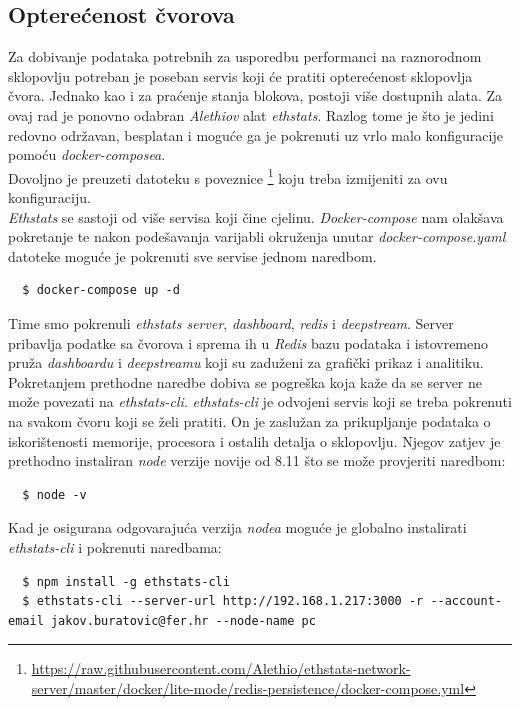\documentclass[times, utf8, zavrsni]{fer}
\begin{document}
\subsection{Opterećenost čvorova}
Za dobivanje podataka potrebnih za usporedbu performanci na raznorodnom sklopovlju potreban je poseban servis koji će pratiti
opterećenost sklopovlja čvora. Jednako kao i za praćenje stanja blokova, postoji više dostupnih alata. Za ovaj rad je ponovno
odabran \emph{Alethiov} alat \emph{ethstats}. Razlog tome je što je jedini redovno održavan, besplatan i moguće ga je pokrenuti
uz vrlo malo konfiguracije pomoću \emph{docker-composea}. \\
Dovoljno je preuzeti datoteku s poveznice
 \footnote{\url{https://raw.githubusercontent.com/Alethio/ethstats-network-server/master/docker/lite-mode/redis-persistence/docker-compose.yml}} koju 
 treba izmijeniti za ovu konfiguraciju. \\
\emph{Ethstats} se sastoji od više servisa koji čine cjelinu. \emph{Docker-compose} nam olakšava pokretanje te nakon podešavanja
varijabli okruženja unutar \emph{docker-compose.yaml} datoteke moguće je pokrenuti sve servise jednom naredbom.
\begin{lstlisting}
  $ docker-compose up -d
\end{lstlisting}
Time smo pokrenuli \emph{ethstats server}, \emph{dashboard}, \emph{redis} i \emph{deepstream}.
Server pribavlja podatke sa čvorova i sprema ih u \emph{Redis} bazu podataka i istovremeno pruža \emph{dashboardu} i \emph{deepstreamu} koji
su zaduženi za grafički prikaz i analitiku. \\
Pokretanjem prethodne naredbe dobiva se pogreška koja kaže da se server ne može povezati na \emph{ethstats-cli}. \emph{ethstats-cli} 
je odvojeni servis koji se treba pokrenuti na svakom čvoru koji se želi pratiti. On je zaslužan za prikupljanje podataka o iskorištenosti
memorije, procesora i ostalih detalja o sklopovlju. Njegov zatjev je prethodno instaliran \emph{node} verzije novije od 8.11 što se može 
provjeriti naredbom:
\begin{lstlisting}
  $ node -v
\end{lstlisting}
Kad je osigurana odgovarajuća verzija \emph{nodea} moguće je globalno instalirati \emph{ethstats-cli} i pokrenuti naredbama:
\begin{lstlisting}
  $ npm install -g ethstats-cli
  $ ethstats-cli --server-url http://192.168.1.217:3000 -r --account-email jakov.buratovic@fer.hr --node-name pc
\end{lstlisting}
\end{document}
